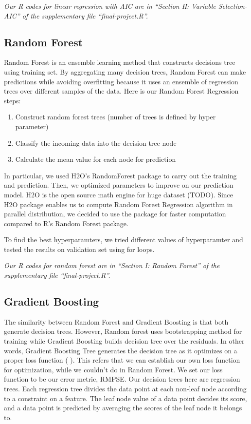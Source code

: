 \documentclass[letterpaper,twocolumn,11pt]{article}
\begin{document}
\textit{Our R codes for linear regression with AIC are in ``Section H: Variable Selection-AIC'' of the supplementary file ``final-project.R''.}

\subsection{Random Forest}
Random Forest is an ensemble learning method that constructs decisions tree using training set. By aggregating many decision trees, Random Forest can make predictions while avoiding overfitting because it uses an ensemble of regression trees over different samples of the data. Here is our Random Forest Regression steps: \\
\begin{enumerate}
\item Construct random forest trees (number of trees is defined by hyper parameter)
\item Classify the incoming data into the decision tree node
\item Calculate the mean value for each node for prediction
\end{enumerate}

In particular, we used H2O’s RandomForest package to carry out the training and prediction. Then, we optimized parameters to improve on our prediction model. H2O is the open source math engine for huge dataset (TODO). Since H2O package enables us to compute Random Forest Regression algorithm in parallel distribution, we decided to use the package for faster computation compared to R's Random Forest package.

To find the best hyperparamters, we tried different values of hyperparamter and tested the results on validation set using for loops.

\textit{Our R codes for random forest are in ``Section I: Random Forest'' of the supplementary file ``final-project.R''.}

\subsection{Gradient Boosting}
The similarity between Random Forest and Gradient Boosting is that both generate decision trees. However, Random forest uses bootstrapping method for training while Gradient Boosting builds decision tree over the residuals. In other words, Gradient Boosting Tree generates the decision tree as it optimizes on a proper loss function (   ). This refers that we can establish our own loss function for optimization, while we couldn't do in Random Forest. We set our loss function to be our error metric, RMPSE. Our decision trees here are regression trees. Each regression tree divides the data point at each non-leaf node according to a constraint on a feature. The leaf node value of a data point decides its score, and a data point is predicted by averaging the scores of the leaf node it belongs to.
\end{document}

